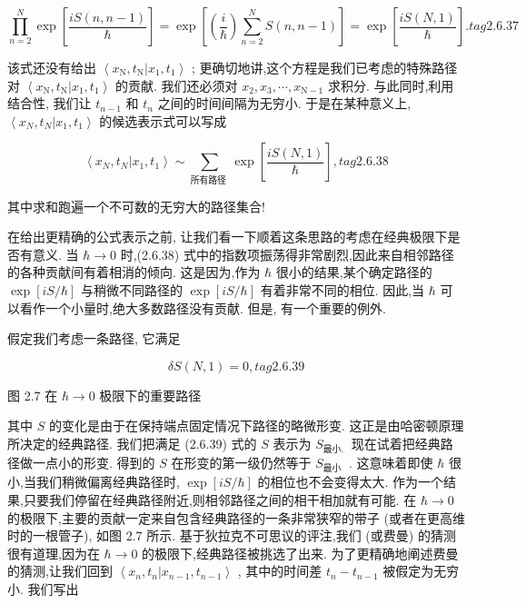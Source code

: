 \documentclass[lang=cn,newtx,10pt,scheme=chinese,thmcnt=section]{elegantbook}
\begin{document}
$$
\mathop{\prod }\limits_{{n = 2}}^{N}\exp \left\lbrack \frac{{iS}\left( {n, n - 1}\right) }{\hbar }\right\rbrack = \exp \left\lbrack {\left( \frac{i}{\hbar }\right) \mathop{\sum }\limits_{{n = 2}}^{N}S\left( {n, n - 1}\right) }\right\rbrack = \exp \left\lbrack \frac{{iS}\left( {N,1}\right) }{\hbar }\right\rbrack . tag{2. 6.37}
$$

该式还没有给出 $\left\langle {{x}_{\mathrm{N}},{t}_{\mathrm{N}} | {x}_{1},{t}_{1}}\right\rangle$ ; 更确切地讲,这个方程是我们已考虑的特殊路径对 $\left\langle {{x}_{\mathrm{N}},{t}_{\mathrm{N}} | {x}_{1},{t}_{1}}\right\rangle$ 的贡献. 我们还必须对 ${x}_{2},{x}_{3},\cdots ,{x}_{\mathrm{N} - 1}$ 求积分. 与此同时,利用结合性, 我们让 ${t}_{n - 1}$ 和 ${t}_{n}$ 之间的时间间隔为无穷小. 于是在某种意义上, $\left\langle {{x}_{N},{t}_{N} | {x}_{1},{t}_{1}}\right\rangle$ 的候选表示式可以写成

$$
\left\langle {{x}_{N},{t}_{N} | {x}_{1},{t}_{1}}\right\rangle \sim \mathop{\sum }\limits_{\text{所有路径 }}\exp \left\lbrack \frac{{iS}\left( {N,1}\right) }{\hbar }\right\rbrack , tag{2. 6.38}
$$

其中求和跑遍一个不可数的无穷大的路径集合!

在给出更精确的公式表示之前, 让我们看一下顺着这条思路的考虑在经典极限下是否有意义. 当 $\hbar \rightarrow 0$ 时,(2.6.38) 式中的指数项振荡得非常剧烈,因此来自相邻路径的各种贡献间有着相消的倾向. 这是因为,作为 $\hbar$ 很小的结果,某个确定路径的 $\exp \left\lbrack {{iS}/\hbar }\right\rbrack$ 与稍微不同路径的 $\exp \left\lbrack {{iS}/\hbar }\right\rbrack$ 有着非常不同的相位. 因此,当 $\hbar$ 可以看作一个小量时,绝大多数路径没有贡献. 但是, 有一个重要的例外.

假定我们考虑一条路径, 它满足

$$
{\delta S}\left( {N,1}\right) = 0, tag{2.6.39}
$$


图 2.7 在 $\hbar \rightarrow 0$ 极限下的重要路径

其中 $S$ 的变化是由于在保持端点固定情况下路径的略微形变. 这正是由哈密顿原理所决定的经典路径. 我们把满足 (2.6.39) 式的 $S$ 表示为 ${S}_{\text{最小. }}$ 现在试着把经典路径做一点小的形变. 得到的 $S$ 在形变的第一级仍然等于 ${S}_{\text{最小 }}$ . 这意味着即使 $\hbar$ 很小,当我们稍微偏离经典路径时, $\exp \left\lbrack {{iS}/\hbar }\right\rbrack$ 的相位也不会变得太大. 作为一个结果,只要我们停留在经典路径附近,则相邻路径之间的相干相加就有可能. 在 $\hbar \rightarrow 0$ 的极限下,主要的贡献一定来自包含经典路径的一条非常狭窄的带子 (或者在更高维时的一根管子), 如图 2.7 所示. 基于狄拉克不可思议的评注,我们 (或费曼) 的猜测很有道理,因为在 $\hbar \rightarrow 0$ 的极限下,经典路径被挑选了出来. 为了更精确地阐述费曼的猜测,让我们回到 $\left\langle {{x}_{n},{t}_{n} | {x}_{n - 1},{t}_{n - 1}}\right\rangle$ , 其中的时间差 ${t}_{n} - {t}_{n - 1}$ 被假定为无穷小. 我们写出
\end{document}
